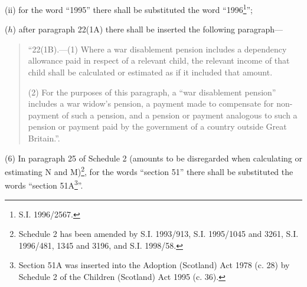 \documentclass[12pt,a4paper]{article}
\begin{document}
\begin{enumerate}
\begin{enumerate}
(ii) for the word “1995” there shall be substituted the word “1996\footnote{\frenchspacing S.I. 1996/2567.}”;
\end{enumerate}

($h$) after paragraph 22(1A) there shall be inserted the following paragraph—

\begin{quotation}
“22(1B).—(1) Where a war disablement pension includes a dependency allowance paid in respect of a relevant child, the relevant income of that child shall be calculated or estimated as if it included that amount.

(2) For the purposes of this paragraph, a “war disablement pension” includes a war widow’s pension, a payment made to compensate for non-payment of such a pension, and a pension or payment analogous to such a pension or payment paid by the government of a country outside Great Britain.”.
\end{quotation}
\end{enumerate}

(6) In paragraph 25 of Schedule 2 (amounts to be disregarded when calculating or estimating N and M)\footnote{\frenchspacing Schedule 2 has been amended by S.I. 1993/913, S.I. 1995/1045 and 3261, S.I. 1996/481, 1345 and 3196, and S.I. 1998/58.}, for the words “section 51” there shall be substituted the words “section 51A\footnote{\frenchspacing Section 51A was inserted into the Adoption (Scotland) Act 1978 (c. 28) by Schedule 2 of the Children (Scotland) Act 1995 (c. 36).}”.
\end{document}

